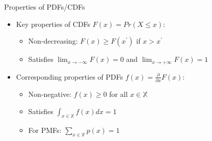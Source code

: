 \documentclass[11pt,english,handout]{beamer}
\begin{document}
\begin{frame}{Properties of PDFs/CDFs}
\vspace{0.2cm}
\begin{itemize}
\item Key properties of CDFs $F(x)=Pr(X\le x)$: 
\smallskip

\begin{itemize}
\item Non-decreasing: $F(x)\ge F(x^\prime)$ if $x > x^\prime$
\vspace{0.1cm}
\item Satisfies $\lim_{x\rightarrow -\infty} F(x)=0$ and $\lim_{x\rightarrow +\infty}F(x)=1$
\end{itemize}
\vspace{0.5cm}
\pause{}

\item Corresponding properties of PDFs $f(x)=\frac{\partial}{\partial x}F(x)$: 
\smallskip

\begin{itemize}
\item Non-negative: $f(x)\ge 0$ for all $x\in\mathbb{X}$
\vspace{0.1cm}
\item Satisfies $\int_{x\in\mathbb{X}}f(x)dx=1$
\vspace{0.1cm}
\item For PMFs: $\sum_{x\in\mathbb{X}}p(x)=1$
\end{itemize}
\end{itemize}

\end{frame}
\end{document}
